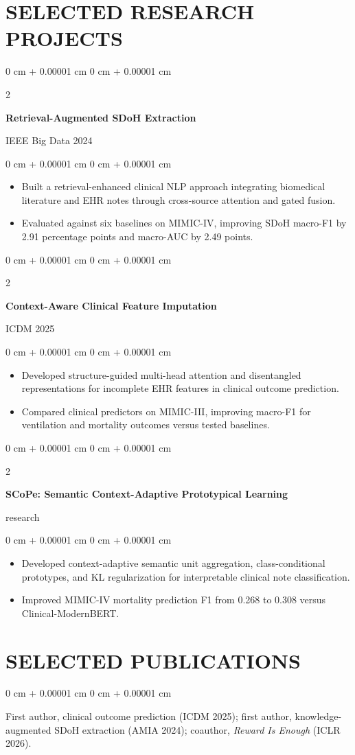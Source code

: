 \documentclass[10pt, letterpaper]{article}
\newenvironment{highlights}{
    \begin{itemize}[
        topsep=0.10 cm,
        parsep=0.10 cm,
        partopsep=0pt,
        itemsep=0pt,
        leftmargin=0 cm + 10pt
    ]
}{
    \end{itemize}
} %
\newenvironment{onecolentry}{
    \begin{adjustwidth}{
        0 cm + 0.00001 cm
    }{
        0 cm + 0.00001 cm
    }
}{
    \end{adjustwidth}
} %
\newenvironment{twocolentry}[2][]{
    \onecolentry
    \def\secondColumn{#2}
    \setcolumnwidth{\fill, 4.5 cm}
    \begin{paracol}{2}
}{
    \switchcolumn \raggedleft \secondColumn
    \end{paracol}
    \endonecolentry
} %
\begin{document}
\section{SELECTED RESEARCH PROJECTS}
\begin{twocolentry}{IEEE Big Data 2024}
\textbf{Retrieval-Augmented SDoH Extraction}
\end{twocolentry}
\begin{onecolentry}
\begin{highlights}
\item Built a retrieval-enhanced clinical NLP approach integrating biomedical literature and EHR notes through cross-source attention and gated fusion.
\item Evaluated against six baselines on MIMIC-IV, improving SDoH macro-F1 by 2.91 percentage points and macro-AUC by 2.49 points.
\end{highlights}
\end{onecolentry}
\vspace{0.02 cm}
\begin{twocolentry}{ICDM 2025}
\textbf{Context-Aware Clinical Feature Imputation}
\end{twocolentry}
\begin{onecolentry}
\begin{highlights}
\item Developed structure-guided multi-head attention and disentangled representations for incomplete EHR features in clinical outcome prediction.
\item Compared clinical predictors on MIMIC-III, improving macro-F1 for ventilation and mortality outcomes versus tested baselines.
\end{highlights}
\end{onecolentry}
\vspace{0.02 cm}
\begin{twocolentry}{2026 research}
\textbf{SCoPe: Semantic Context-Adaptive Prototypical Learning}
\end{twocolentry}
\begin{onecolentry}
\begin{highlights}
\item Developed context-adaptive semantic unit aggregation, class-conditional prototypes, and KL regularization for interpretable clinical note classification.
\item Improved MIMIC-IV mortality prediction F1 from 0.268 to 0.308 versus Clinical-ModernBERT.
\end{highlights}
\end{onecolentry}
\vspace{0.02 cm}
\section{SELECTED PUBLICATIONS}
\begin{onecolentry}
First author, clinical outcome prediction (ICDM 2025); first author, knowledge-augmented SDoH extraction (AMIA 2024); coauthor, \textit{Reward Is Enough} (ICLR 2026).
\end{onecolentry}
\end{document}

